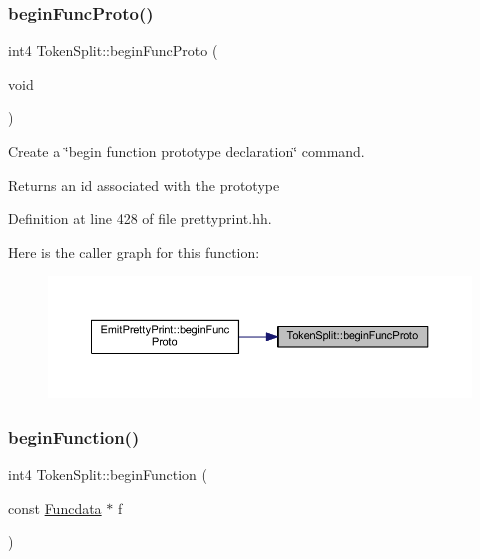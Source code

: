 \subsubsection{\texorpdfstring{beginFuncProto()}{beginFuncProto()}}
{\footnotesize\ttfamily int4 Token\+Split\+::begin\+Func\+Proto (\begin{DoxyParamCaption}\item[{void}]{ }\end{DoxyParamCaption})\hspace{0.3cm}{\ttfamily [inline]}}



Create a \char`\"{}begin function prototype declaration\char`\"{} command. 

\begin{DoxyReturn}{Returns}
an id associated with the prototype 
\end{DoxyReturn}


Definition at line 428 of file prettyprint.\+hh.

Here is the caller graph for this function\+:
\nopagebreak
\begin{figure}[H]
\begin{center}
\leavevmode
\includegraphics[width=350pt]{class_token_split_a1b95fd9e440ec5036959e32667561885_icgraph}
\end{center}
\end{figure}
\mbox{\label{class_token_split_a53510d715ff1109c33f75226e429d8e7}} 
\subsubsection{\texorpdfstring{beginFunction()}{beginFunction()}}
{\footnotesize\ttfamily int4 Token\+Split\+::begin\+Function (\begin{DoxyParamCaption}\item[{const \mbox{\hyperlink{class_funcdata}{Funcdata}} $\ast$}]{f }\end{DoxyParamCaption})\hspace{0.3cm}{\ttfamily [inline]}}



